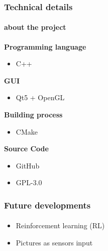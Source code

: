 \documentclass{beamer}
\begin{document}
\begin{frame}
	\frametitle{Technical details}
	\framesubtitle{about the project}

	\begin{block}{\textbf{Programming language}}
		\begin{itemize}
			\item C++
		\end{itemize}
	\end{block}
	\begin{exampleblock}{\textbf{GUI}}
		\begin{itemize}
			\item Qt5 + OpenGL
		\end{itemize}
	\end{exampleblock}
	\begin{block}{\textbf{Building process}}
		\begin{itemize}
			\item CMake
		\end{itemize}
	\end{block}
	\begin{exampleblock}{\textbf{Source Code}}
		\begin{itemize}
			\item GitHub
			\item GPL-3.0
		\end{itemize}
	\end{exampleblock}
\end{frame}

\begin{frame}
	\frametitle{Future developments}
	\framesubtitle{ }

	\begin{block}{}
		\begin{itemize}
			\item Reinforcement learning (RL)
			\item Pictures as sensors input
		\end{itemize}
	\end{block}
\end{frame}
\end{document}
